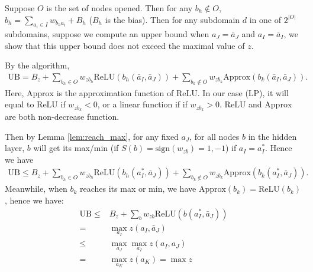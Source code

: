 \documentclass[]{article}
\theoremstyle{definition}
\newcommand{\ReLU}{\mathrm{ReLU}}
\begin{document}
Suppose $O$ is the set of nodes opened. Then for any $b_h\notin O$, $b_h=\sum_{a_i\in I}w_{b_ha_i}+B_h$ ($B_h$ is the bias). Then for any subdomain $d$ in one of  $2^{|O|}$ subdomains, suppose we compute an upper bound when $a_J=\bar{a}_J$ and $a_I=\bar{a}_I$, we show that this upper bound does not exceed the maximal value of $z$. 

By the algorithm, \begin{align*}
	\mathrm{UB} = B_z+\sum_{b_h\in O}w_{zb_h}\ReLU(b_h(\bar{a}_I,\bar{a}_J))+\sum_{b_k\notin O}w_{zb_k}\mathrm{Approx}(b_k(\bar{a}_I,\bar{a}_J)).
\end{align*} Here, $\mathrm{Approx}$ is the approximation function of $\mathrm{ReLU}$. In our case (LP), it will equal to $\ReLU$ if $w_{zb_k}<0$, or a linear function if  if $w_{zb_k}>0$. $\mathrm{ReLU}$ and $\mathrm{Approx}$ are both non-decrease function.

Then by Lemma \ref{lem:reach_max}, for any fixed $a_J$, for all nodes $b$ in the hidden layer, $b$ will get its max/min (if $S(b)=\mathrm{sign}(w_{zb})=1,-1$) if $a_I=a_I^*$. Hence we have \begin{align*}
	\mathrm{UB} \leq  B_z+\sum_{b_h\in O}w_{zb_h}\ReLU(b_h(a_I^*,\bar{a}_J))+\sum_{b_k\notin O}w_{zb_k}\mathrm{Approx}(b_k(a_I^*,\bar{a}_J)).
\end{align*} Meanwhile, when $b_k$ reaches its max or min, we have $\mathrm{Approx}(b_k)=\ReLU(b_k)$, hence we have: \begin{align*}
	\mathrm{UB} \leq & B_z+\sum_{b}w_{zb}\ReLU(b(a_I^*,\bar{a}_J))\\
	= & \max_{a_I} z(a_I,\bar{a}_J)\\
	\leq & \max_{a_J}\max_{a_I} z(a_I,a_J)\\
	= & \max_{a_K} z(a_K) = \max z
\end{align*}
\end{document}
